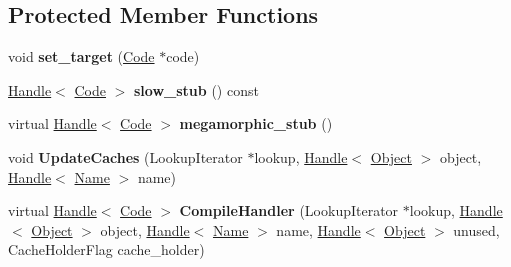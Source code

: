 \subsection*{Protected Member Functions}
\begin{DoxyCompactItemize}
\item 
\hypertarget{classv8_1_1internal_1_1_load_i_c_a4c65e0632f4c487a068f380d364dd74d}{}void {\bfseries set\+\_\+target} (\hyperlink{classv8_1_1internal_1_1_code}{Code} $\ast$code)\label{classv8_1_1internal_1_1_load_i_c_a4c65e0632f4c487a068f380d364dd74d}

\item 
\hypertarget{classv8_1_1internal_1_1_load_i_c_a2c0196a280a99bf08f24f50e3c34352f}{}\hyperlink{classv8_1_1internal_1_1_handle}{Handle}$<$ \hyperlink{classv8_1_1internal_1_1_code}{Code} $>$ {\bfseries slow\+\_\+stub} () const \label{classv8_1_1internal_1_1_load_i_c_a2c0196a280a99bf08f24f50e3c34352f}

\item 
\hypertarget{classv8_1_1internal_1_1_load_i_c_a55443f4a1c57d8f390b554185e6f336d}{}virtual \hyperlink{classv8_1_1internal_1_1_handle}{Handle}$<$ \hyperlink{classv8_1_1internal_1_1_code}{Code} $>$ {\bfseries megamorphic\+\_\+stub} ()\label{classv8_1_1internal_1_1_load_i_c_a55443f4a1c57d8f390b554185e6f336d}

\item 
\hypertarget{classv8_1_1internal_1_1_load_i_c_a0e6a6a81882bdad350adbb169661d6a4}{}void {\bfseries Update\+Caches} (Lookup\+Iterator $\ast$lookup, \hyperlink{classv8_1_1internal_1_1_handle}{Handle}$<$ \hyperlink{classv8_1_1internal_1_1_object}{Object} $>$ object, \hyperlink{classv8_1_1internal_1_1_handle}{Handle}$<$ \hyperlink{classv8_1_1internal_1_1_name}{Name} $>$ name)\label{classv8_1_1internal_1_1_load_i_c_a0e6a6a81882bdad350adbb169661d6a4}

\item 
\hypertarget{classv8_1_1internal_1_1_load_i_c_a96c2b05b9b6cc41ebf6d9b3304299c63}{}virtual \hyperlink{classv8_1_1internal_1_1_handle}{Handle}$<$ \hyperlink{classv8_1_1internal_1_1_code}{Code} $>$ {\bfseries Compile\+Handler} (Lookup\+Iterator $\ast$lookup, \hyperlink{classv8_1_1internal_1_1_handle}{Handle}$<$ \hyperlink{classv8_1_1internal_1_1_object}{Object} $>$ object, \hyperlink{classv8_1_1internal_1_1_handle}{Handle}$<$ \hyperlink{classv8_1_1internal_1_1_name}{Name} $>$ name, \hyperlink{classv8_1_1internal_1_1_handle}{Handle}$<$ \hyperlink{classv8_1_1internal_1_1_object}{Object} $>$ unused, Cache\+Holder\+Flag cache\+\_\+holder)\label{classv8_1_1internal_1_1_load_i_c_a96c2b05b9b6cc41ebf6d9b3304299c63}

\end{DoxyCompactItemize}
